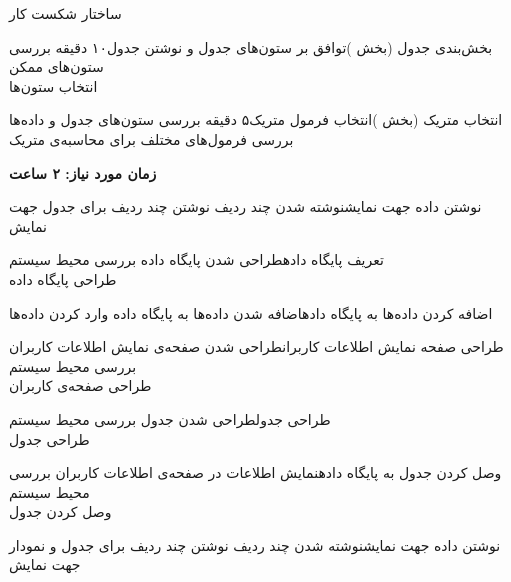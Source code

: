 \begin{wbsbox}{ساختار شکست کار}
\begin{wbssub}{بخش‌بندی جدول (بخش )}{توافق بر ستون‌های جدول و نوشتن جدول}{۱۰ دقیقه}
\task بررسی ستون‌های ممکن \\
\task انتخاب ستون‌ها
\end{wbssub}

\begin{wbssub}{انتخاب متریک (بخش )}{انتخاب فرمول متریک}{۵ دقیقه}
\task بررسی ستون‌های جدول و داده‌ها\\
\task بررسی فرمول‌های مختلف ‌برای محاسبه‌ی متریک
\end{wbssub}
\begin{center}
\textbf{زمان مورد نیاز: ۲ ساعت}
\end{center}

\begin{wbssub}{نوشتن داده جهت نمایش}{نوشته شدن چند ردیف}{}
\task نوشتن چند ردیف برای جدول جهت نمایش
\end{wbssub}

\begin{wbssub}{تعریف پایگاه داده}{طراحی شدن پایگاه داده}{}
\task بررسی محیط سیستم  \\
\task طراحی پایگاه داده
\end{wbssub}

\begin{wbssub}{اضافه کردن داده‌ها به پایگاه داده}{اضافه شدن داده‌ها به پایگاه داده}{}
\task وارد کردن داده‌ها
\end{wbssub}

\begin{wbssub}{طراحی صفحه نمایش اطلاعات کاربران}{طراحی شدن صفحه‌ی نمایش اطلاعات کاربران}{}
\task بررسی محیط سیستم  \\
\task طراحی صفحه‌ی کاربران
\end{wbssub}

\begin{wbssub}{طراحی جدول}{طراحی شدن جدول}{}
\task بررسی محیط سیستم  \\
\task طراحی جدول
\end{wbssub}

\begin{wbssub}{وصل کردن جدول به پایگاه داده}{نمایش اطلاعات در صفحه‌ی اطلاعات کاربران}{}
\task بررسی محیط سیستم  \\
\task وصل کردن جدول
\end{wbssub}

\begin{wbssub}{نوشتن داده جهت نمایش}{نوشته شدن چند ردیف}{}
\task نوشتن چند ردیف برای جدول و نمودار جهت نمایش
\end{wbssub}


\end{wbsbox}
